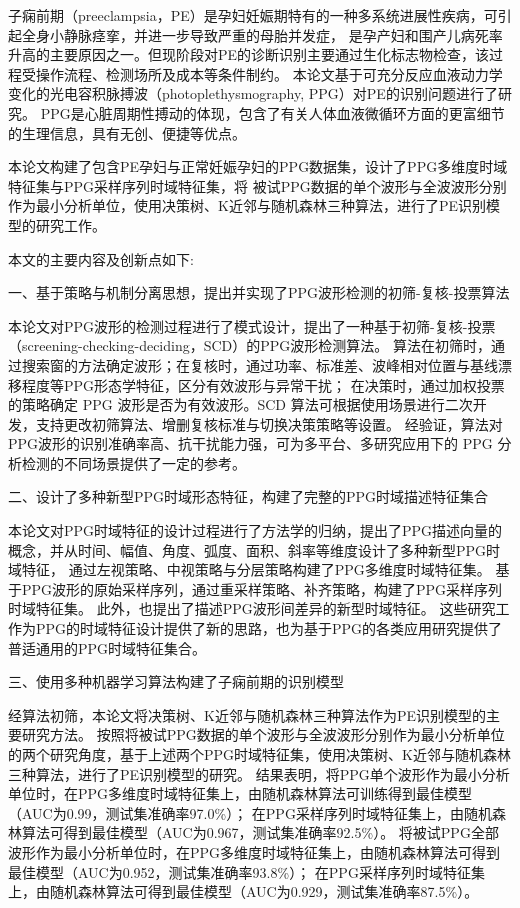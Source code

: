 \cleardoublepage
{}
子痫前期（preeclampsia，PE）是孕妇妊娠期特有的一种多系统进展性疾病，可引起全身小静脉痉挛，并进一步导致严重的母胎并发症，
是孕产妇和围产儿病死率升高的主要原因之一。但现阶段对PE的诊断识别主要通过生化标志物检查，该过程受操作流程、检测场所及成本等条件制约。
本论文基于可充分反应血液动力学变化的光电容积脉搏波（photoplethysmography, PPG）对PE的识别问题进行了研究。
PPG是心脏周期性搏动的体现，包含了有关人体血液微循环方面的更富细节的生理信息，具有无创、便捷等优点。

本论文构建了包含PE孕妇与正常妊娠孕妇的PPG数据集，设计了PPG多维度时域特征集与PPG采样序列时域特征集，将
被试PPG数据的单个波形与全波波形分别作为最小分析单位，使用决策树、K近邻与随机森林三种算法，进行了PE识别模型的研究工作。

本文的主要内容及创新点如下:

一、基于策略与机制分离思想，提出并实现了PPG波形检测的初筛-复核-投票算法

本论文对PPG波形的检测过程进行了模式设计，提出了一种基于初筛-复核-投票（screening-checking-deciding，SCD）的PPG波形检测算法。
算法在初筛时，通过搜索窗的方法确定波形；在复核时，通过功率、标准差、波峰相对位置与基线漂移程度等PPG形态学特征，区分有效波形与异常干扰；
在决策时，通过加权投票的策略确定 PPG 波形是否为有效波形。SCD 算法可根据使用场景进行二次开发，支持更改初筛算法、增删复核标准与切换决策策略等设置。
经验证，算法对PPG波形的识别准确率高、抗干扰能力强，可为多平台、多研究应用下的 PPG 分析检测的不同场景提供了一定的参考。

二、设计了多种新型PPG时域形态特征，构建了完整的PPG时域描述特征集合

本论文对PPG时域特征的设计过程进行了方法学的归纳，提出了PPG描述向量的概念，并从时间、幅值、角度、弧度、面积、斜率等维度设计了多种新型PPG时域特征，
通过左视策略、中视策略与分层策略构建了PPG多维度时域特征集。
基于PPG波形的原始采样序列，通过重采样策略、补齐策略，构建了PPG采样序列时域特征集。
此外，也提出了描述PPG波形间差异的新型时域特征。
这些研究工作为PPG的时域特征设计提供了新的思路，也为基于PPG的各类应用研究提供了普适通用的PPG时域特征集合。

三、使用多种机器学习算法构建了子痫前期的识别模型

经算法初筛，本论文将决策树、K近邻与随机森林三种算法作为PE识别模型的主要研究方法。
按照将被试PPG数据的单个波形与全波波形分别作为最小分析单位的两个研究角度，基于上述两个PPG时域特征集，使用决策树、K近邻与随机森林三种算法，进行了PE识别模型的研究。
结果表明，将PPG单个波形作为最小分析单位时，在PPG多维度时域特征集上，由随机森林算法可训练得到最佳模型（AUC为0.99，测试集准确率97.0\%）；
在PPG采样序列时域特征集上，由随机森林算法可得到最佳模型（AUC为0.967，测试集准确率92.5\%）。
将被试PPG全部波形作为最小分析单位时，在PPG多维度时域特征集上，由随机森林算法可得到最佳模型（AUC为0.952，测试集准确率93.8\%）；
在PPG采样序列时域特征集上，由随机森林算法可得到最佳模型（AUC为0.929，测试集准确率87.5\%）。

